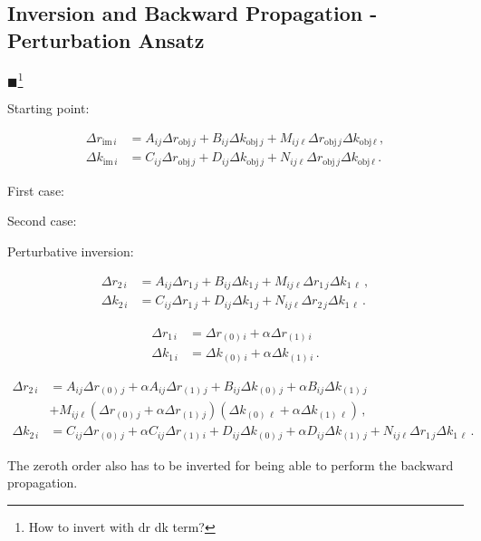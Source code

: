 \documentclass[12pt,a4paper,twoside,openright,BCOR10mm,headsepline,titlepage,abstracton,chapterprefix,final]{scrreprt}
\newcommand{\remark}[1]{{\color{red}$\blacksquare$}\footnote{{\color{red}#1}}}
\begin{document}
\subsection{Inversion and Backward Propagation - Perturbation Ansatz}

\remark{How to invert with dr dk term?}

\newcommand{\dr}[2]{\Delta {r}_{#1\,#2}}
\newcommand{\dk}[2]{\Delta {k}_{#1\,#2}}

Starting point:

\begin{eqnarray}
 \dr{\text{im}}{i} & = A_{ij} \dr{\text{obj}}{j} + B_{ij} \dk{\text{obj}}{j} + M_{ij\ell} \dr{\text{obj}}{j} \dk{\text{obj}}{\ell}\,,\\
 \dk{\text{im}}{i} & = C_{ij} \dr{\text{obj}}{j} + D_{ij} \dk{\text{obj}}{j} + N_{ij\ell} \dr{\text{obj}}{j} \dk{\text{obj}}{\ell}\,.
\end{eqnarray}

First case:

Second case:

Perturbative inversion:

\begin{eqnarray}
 \dr{2}{i} & = A_{ij} \dr{1}{j} + B_{ij} \dk{1}{j} + M_{ij\ell} \dr{1}{j} \dk{1}{\ell}\,,\\
 \dk{2}{i} & = C_{ij} \dr{1}{j} + D_{ij} \dk{1}{j} + N_{ij\ell} \dr{2}{j} \dk{1}{\ell}\,.
\end{eqnarray}

\begin{eqnarray}
 \dr{1}{i} & = \dr{(0)}{i} + \alpha \dr{(1)}{i}\\
 \dk{1}{i} & = \dk{(0)}{i} + \alpha \dk{(1)}{i}\,.
\end{eqnarray}

\begin{eqnarray}
 \dr{2}{i} & = A_{ij} \dr{(0)}{j} + \alpha A_{ij} \dr{(1)}{j} + B_{ij} \dk{(0)}{j} + \alpha B_{ij}\dk{(1)}{j}\nonumber\\
  & + M_{ij\ell} (\dr{(0)}{j} + \alpha \dr{(1)}{j}) (\dk{(0)}{\ell} + \alpha \dk{(1)}{\ell})\,,\\
 \dk{2}{i} & = C_{ij} \dr{(0)}{j} + \alpha C_{ij} \dr{(1)}{i} + D_{ij} \dk{(0)}{j} + \alpha D_{ij}\dk{(1)}{j} + N_{ij\ell} \dr{1}{j} \dk{1}{\ell}\,.
\end{eqnarray}

The zeroth order also has to be inverted for being able to perform the backward propagation.
\end{document}
